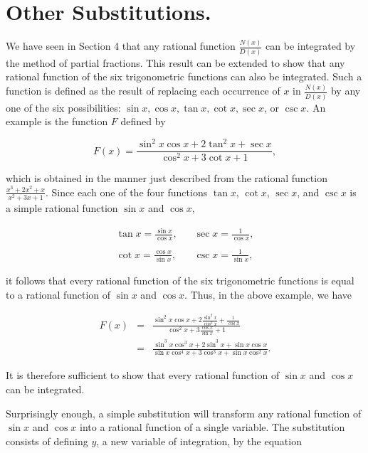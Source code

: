 \section{Other Substitutions.}
We have seen in Section 4 that any rational function $\frac{N(x)}{D(x)}$ can be integrated by the method of partial fractions. This result can be
extended to show that any rational function of the six trigonometric functions can also be integrated. Such a function is defined as the result of replacing
each occurrence of $x$ in $\frac{N(x)}{D(x)}$ by any one of the six possibilities: $\sin x, \cos x, \tan x, \cot x, \sec x$, or $\csc x$. An example is the function $F$ defined by

$$
F(x) = \frac{\sin^{2}x \cos x + 2\tan^{2}x + \sec x}{\cos^{2}x + 3 \cot x + 1},
$$

\noindent which is obtained in the manner just described from the rational function $\frac{x^3 + 2x^2 + x}{x^2 + 3x + 1}$. Since each one of the four functions $\tan x$, $\cot x$, $\sec x$, and $\csc x$ is a simple rational function $\sin x$ and $\cos x$,

$$
\begin{array}{ll}
\tan x = \frac{\sin x}{\cos x},\;\;\; &   \sec x = \frac{1}{ \cos x},\\
                                                                                               \\
\cot x = \frac{\cos x}{\sin x},\;\;\; &   \csc x = \frac{1}{ \sin x },
\end{array}
$$

\noindent it follows that every rational function of the six trigonometric functions is equal to a rational function of $\sin x$ and $\cos x$. Thus, in the above example, we have  


\begin{eqnarray*}
F(x) &=& \frac{\sin^2 x \cos x + 2 \frac{\sin^2 x}{\cos^2x} + \frac{1}{\cos x}}{\cos^2 x + 3 \frac{\cos x}{\sin x} + 1}\\
&=& \frac{\sin^3 x \cos^3 x + 2 \sin^3x + \sin x \cos x}
{\sin x \cos^4 x + 3 \cos^3 x + \sin x \cos^2 x}.
\end{eqnarray*}

\noindent It is therefore sufficient to show that every rational function of $\sin x$ and $\cos x$ can be integrated.

Surprisingly enough, a simple substitution will transform any rational function of $\sin x$ and $\cos x$ into a rational function of a single variable. The substitution consists of defining $y$, a new variable of integration, by the equation


